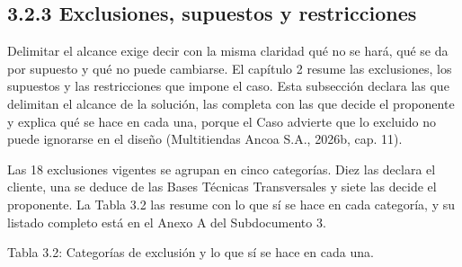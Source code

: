 \documentclass[11pt]{article}
\begin{document}


\subsection{3.2.3 Exclusiones, supuestos y restricciones}

Delimitar el alcance exige decir con la misma claridad qué no se hará, qué se da por supuesto y qué no puede cambiarse. El capítulo 2 resume las exclusiones, los supuestos y las restricciones que impone el caso. Esta subsección declara las que delimitan el alcance de la solución, las completa con las que decide el proponente y explica qué se hace en cada una, porque el Caso advierte que lo excluido no puede ignorarse en el diseño (Multitiendas Ancoa S.A., 2026b, cap. 11).

Las 18 exclusiones vigentes se agrupan en cinco categorías. Diez las declara el cliente, una se deduce de las Bases Técnicas Transversales y siete las decide el proponente. La Tabla 3.2 las resume con lo que sí se hace en cada categoría, y su listado completo está en el Anexo A del Subdocumento 3.

Tabla 3.2: Categorías de exclusión y lo que sí se hace en cada una.
\end{document}
